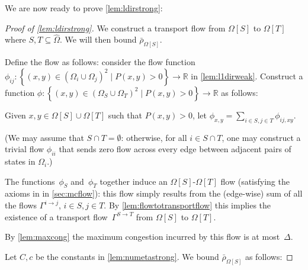 \documentclass[a4paper, 12p]{article}
\numberwithin{equation}{section}
\newcommand{\Omorproj}{\hat{\Omega}}
\begin{document}
We are now ready to prove \cref{lem:ldirstrong}:
\begin{proof}[Proof of \cref{lem:ldirstrong}]
We construct a transport flow from $\Omega[S]$ to $\Omega[T]$ where $S, T\subseteq \Omorproj$. We will then bound $\bar \rho_{\Omega[S]}$.

Define the flow as follows: consider the flow function $\phi_{ij}: \left\{(x, y) \in (\Omega_i \cup \Omega_j)^2\mid P(x, y) > 0\right\} \rightarrow \mathbb{R}$ in \cref{lem:l1dirweak}. Construct a function $\phi: \left\{(x, y) \in (\Omega_S \cup \Omega_T)^2 \mid P(x, y) > 0\right\} \rightarrow \mathbb{R}$ as follows:

Given $x, y \in \Omega[S] \cup \Omega[T]$ such that $P(x, y) > 0$, let $\phi_{x, y} = \sum_{i \in S, j \in T}\phi_{ij,xy}$.

(We may assume that $S \cap T = \emptyset$: otherwise, for all $i \in S \cap T$, one may construct a trivial flow $\phi_{ii}$ that sends zero flow across every edge between adjacent pairs of states in $\Omega_i$.)

The functions~$\phi_{S}$ and~$\phi_{T}$ together induce an $\Omega[S]$-$\Omega[T]$ flow (satisfying the axioms in in \cref{sec:mcflow}): this flow simply results from the (edge-wise) sum of all the flows $\Gamma^{i\rightarrow j}$, $i \in S, j \in T$. By \cref{lem:flowtotransportflow} this implies the existence of a transport flow~$\Gamma^{S\rightarrow T}$ from $\Omega[S]$ to $\Omega[T]$.

By \cref{lem:maxcong} the maximum congestion incurred by this flow is at most~$\Delta$.

Let $C, c$ be the constants in \cref{lem:numetastrong}.  We bound $\bar \rho_{\Omega[S]}$ as follows:


\end{proof}
\end{document}
